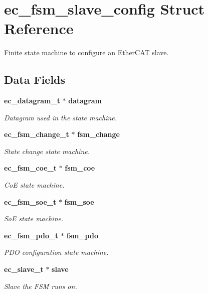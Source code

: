 \section{ec\-\_\-fsm\-\_\-slave\-\_\-config \-Struct \-Reference}
\label{structec__fsm__slave__config}


\-Finite state machine to configure an \-Ether\-C\-A\-T slave.  


\subsection*{\-Data \-Fields}
\begin{DoxyCompactItemize}
\item 
{\bf ec\-\_\-datagram\-\_\-t} $\ast$ {\bf datagram}
\begin{DoxyCompactList}\small\item\em \-Datagram used in the state machine. \end{DoxyCompactList}\item 
{\bf ec\-\_\-fsm\-\_\-change\-\_\-t} $\ast$ {\bf fsm\-\_\-change}
\begin{DoxyCompactList}\small\item\em \-State change state machine. \end{DoxyCompactList}\item 
{\bf ec\-\_\-fsm\-\_\-coe\-\_\-t} $\ast$ {\bf fsm\-\_\-coe}
\begin{DoxyCompactList}\small\item\em \-Co\-E state machine. \end{DoxyCompactList}\item 
{\bf ec\-\_\-fsm\-\_\-soe\-\_\-t} $\ast$ {\bf fsm\-\_\-soe}
\begin{DoxyCompactList}\small\item\em \-So\-E state machine. \end{DoxyCompactList}\item 
{\bf ec\-\_\-fsm\-\_\-pdo\-\_\-t} $\ast$ {\bf fsm\-\_\-pdo}
\begin{DoxyCompactList}\small\item\em \-P\-D\-O configuration state machine. \end{DoxyCompactList}\item 
{\bf ec\-\_\-slave\-\_\-t} $\ast$ {\bf slave}
\begin{DoxyCompactList}\small\item\em \-Slave the \-F\-S\-M runs on. \end{DoxyCompactList}\item 

\end{DoxyCompactItemize}
